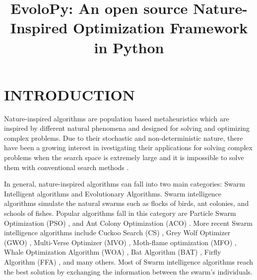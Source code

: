 \documentclass[a4paper,twoside]{article}
\begin{document}
\title{EvoloPy: An open source Nature-Inspired Optimization Framework in Python}

\author{
}




\onecolumn \maketitle \normalsize \vfil
\section{\uppercase{Introduction}}

\label{sec:introduction}


Nature-inspired algorithms are population based metaheuristics which are inspired by different natural phenomena and designed for solving and optimizing complex problems. Due to their stochastic and non-deterministic nature, there have been a growing interest in ivestigating their applications for solving complex problems when the search space is extremely large and it is impossible to solve them with conventional search methods \cite{Yang_2013}. 

In general, nature-inspired algorithms can fall into two main categories: Swarm Intelligent algorithms and Evolutionary Algorithms. Swarm intelligence algorithms simulate the natural swarms such as flocks of birds, ant colonies, and schools of fishes. Popular algorithms fall in this category are Particle Swarm Optimization (PSO) \cite{Kennedy95}, and Ant Colony Optimization (ACO) \cite{Koro_ec_2009}. More recent Swarm intelligence algorithms include Cuckoo Search (CS) \cite{Yang2009}, Grey Wolf Optimizer (GWO) \cite{Mirjalili201446}, Multi-Verse Optimizer (MVO) \cite{Mirjalili2016}, Moth-flame optimization (MFO) \cite{Mirjalili2015228}, Whale Optimization Algorithm (WOA) \cite{Mirjalili201651}, Bat Algorithm (BAT) \cite{Yang2010}, Firfly Algorithm (FFA) \cite{Yang2010FFA}, and many others. Most of Swarm intelligence algorithms reach the best solution by exchanging the information between the swarm's individuals. 
\end{document}
